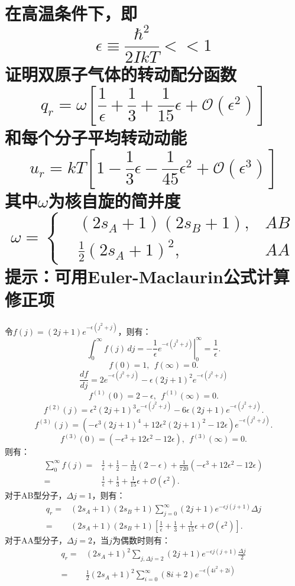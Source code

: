 \documentclass[reqno,a4paper,12pt]{amsart}
\begin{document}
\section{在高温条件下，即
\[
	\epsilon \equiv \frac{\hbar^2}{2IkT} << 1
\]
证明双原子气体的转动配分函数
\[
	q_r = \omega \left[ \frac{1}{\epsilon} + \frac{1}{3} + \frac{1}{15}\epsilon + \mathcal{O}(\epsilon^2) \right]
\]
和每个分子平均转动动能
\[
	u_r = kT\left[ 1 - \frac{1}{3}\epsilon - \frac{1}{45}\epsilon^2 + \mathcal{O}(\epsilon^3) \right]
\]
其中$\omega$为核自旋的简并度
\[
	\omega = \left\{
	\begin{aligned}
		&(2s_A+1)(2s_B+1), & AB \\
		&\frac{1}{2}(2s_A+1)^2, & AA
	\end{aligned}\right.
\]
提示：可用Euler-Maclaurin公式计算修正项
}
\begin{tcolorbox}[breakable, colback = black!5!white, colframe = black]
令$f(j) = (2j+1)e^{-\epsilon(j^2+j)}$，则有：
\[
	\int_0^{\infty} f(j)\,dj = \left. -\frac{1}{\epsilon}e^{-\epsilon(j^2+j)} \right\vert_0^\infty = \frac{1}{\epsilon}.
\]
\[
	f(0) = 1, ~~ f(\infty) = 0.
\]
\[
	\frac{df}{dj} = 2e^{-\epsilon(j^2+j)} - \epsilon(2j+1)^2e^{-\epsilon(j^2+j)}
\]
\[
	f^{(1)}(0) = 2-\epsilon, ~~ f^{(1)}(\infty) = 0.
\]
\[
	f^{(2)}(j) = \epsilon^2(2j+1)^3e^{-\epsilon(j^2+j)} - 6\epsilon(2j+1) e^{-\epsilon(j^2+j)}.
\]
\[
	f^{(3)}(j) = \left( -\epsilon^3(2j+1)^4 + 12\epsilon^2(2j+1)^2 - 12\epsilon \right)e^{-\epsilon(j^2+j)}.
\]
\[
	f^{(3)}(0) = (-\epsilon^3 + 12\epsilon^2 - 12\epsilon), ~~ f^{(3)}(\infty) = 0.
\]
则有：
\begin{align*}
	\sum_0^{\infty} f(j) =& \frac{1}{\epsilon} + \frac{1}{2} - \frac{1}{12}(2-\epsilon) + \frac{1}{720}(-\epsilon^3 + 12\epsilon^2 - 12\epsilon) \\ 
	=& \frac{1}{\epsilon} + \frac{1}{3} + \frac{1}{15}\epsilon + \mathcal{O}(\epsilon^2).
\end{align*}
对于AB型分子，$\Delta j = 1$，则有：
\begin{align*}
	q_r =& (2s_A+1)(2s_B+1)\sum_{j=0}^{\infty}(2j+1)e^{-\epsilon j(j+1)}\Delta j \\
	=& (2s_A+1)(2s_B+1) \left[ \frac{1}{\epsilon} + \frac{1}{3} + \frac{1}{15}\epsilon + \mathcal{O}(\epsilon^2) \right].
\end{align*}
对于AA型分子，$\Delta j = 2$，当$j$为偶数时则有：
\begin{align*}
	q_r =& (2s_A+1)^2 \sum_{j,\Delta j =2}(2j+1)e^{-\epsilon j(j+1)} \frac{\Delta j}{2} \\
	=& \frac{1}{2}(2s_A+1)^2 \sum_{i=0}^{\infty} (8i+2) e^{-\epsilon (4i^2+2i)}

\end{align*}
\end{tcolorbox}
\end{document}
